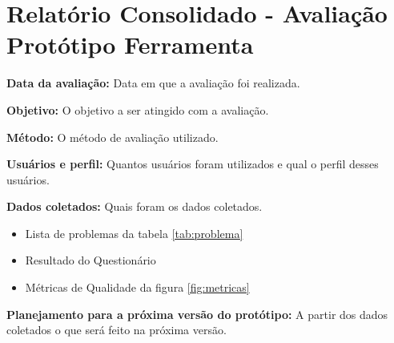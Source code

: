 \section{Relatório Consolidado - Avaliação Protótipo Ferramenta}

\flushleft \textbf{Data da avaliação:} 
Data em que a avaliação foi realizada.

\textbf{Objetivo:}
O objetivo a ser atingido com a avaliação.

\textbf{Método:}
O método de avaliação utilizado.

\textbf{Usuários e perfil:}
Quantos usuários foram utilizados e qual o perfil desses usuários.

\textbf{Dados coletados:}
Quais foram os dados coletados.

\begin{itemize}
 \item Lista de problemas da tabela \ref{tab:problema}
 \item Resultado do Questionário
 \item Métricas de Qualidade da figura \ref{fig:metricas}
\end{itemize}


\textbf{Planejamento para a próxima versão do protótipo:}
A partir dos dados coletados o que será feito na próxima versão.

\vfill
\pagebreak
